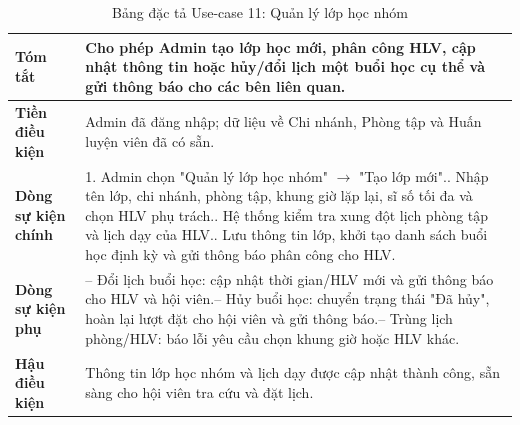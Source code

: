 \documentclass[a4paper,12pt]{article}
\begin{document}
\begin{table}[H]\centering\footnotesize
\begin{tabularx}{\textwidth}{|L{3.2cm}|Y|}
\hline \textbf{Tóm tắt} & Cho phép Admin tạo lớp học mới, phân công HLV, cập nhật thông tin hoặc hủy/đổi lịch một buổi học cụ thể và gửi thông báo cho các bên liên quan. \\ \hline
\textbf{Tiền điều kiện} & Admin đã đăng nhập; dữ liệu về Chi nhánh, Phòng tập và Huấn luyện viên đã có sẵn. \\ \hline
\textbf{Dòng sự kiện chính} & 1. Admin chọn "Quản lý lớp học nhóm" $\rightarrow$ "Tạo lớp mới".. Nhập tên lớp, chi nhánh, phòng tập, khung giờ lặp lại, sĩ số tối đa và chọn HLV phụ trách.. Hệ thống kiểm tra xung đột lịch phòng tập và lịch dạy của HLV.. Lưu thông tin lớp, khởi tạo danh sách buổi học định kỳ và gửi thông báo phân công cho HLV. \\ \hline
\textbf{Dòng sự kiện phụ} & -- Đổi lịch buổi học: cập nhật thời gian/HLV mới và gửi thông báo cho HLV và hội viên.\newline -- Hủy buổi học: chuyển trạng thái "Đã hủy", hoàn lại lượt đặt cho hội viên và gửi thông báo.\newline -- Trùng lịch phòng/HLV: báo lỗi yêu cầu chọn khung giờ hoặc HLV khác. \\ \hline
\textbf{Hậu điều kiện} & Thông tin lớp học nhóm và lịch dạy được cập nhật thành công, sẵn sàng cho hội viên tra cứu và đặt lịch. \\ \hline
\end{tabularx}
\caption{Bảng đặc tả Use-case 11: Quản lý lớp học nhóm}
\end{table}
\end{document}

